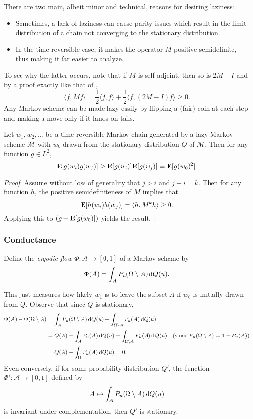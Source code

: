 There are two main, albeit minor and technical, reasons for desiring laziness:
\begin{itemize}
    \item Sometimes, a lack of laziness can cause parity issues which result in the limit distribution of a chain not converging to the stationary distribution.
    \item In the time-reversible case, it makes the operator $M$ positive semidefinite, thus making it far easier to analyze.
\end{itemize}
To see why the latter occurs, note that if $M$ is self-adjoint, then so is $2M-I$ and by a proof exactly like that of ,
\[ \langle f,M f\rangle = \frac{1}{2}\langle f,f\rangle + \frac{1}{2}\langle f,(2M-I)f\rangle \geq 0. \]
Any Markov scheme can be made lazy easily by flipping a (fair) coin at each step and making a move only if it lands on tails.

\begin{lemma}
Let $w_1,w_2,\ldots$ be a time-reversible Markov chain generated by a lazy Markov scheme $\mathcal{M}$ with $w_0$ drawn from the stationary distribution $Q$ of $\mathcal{M}$. Then for any function $g\in L^2$,
\[ \textbf{E}[g(w_i)g(w_j)] \geq \textbf{E}[g(w_i)]\textbf{E}[g(w_j)] = \textbf{E}[g(w_0)^2]. \]
\end{lemma}
\begin{proof}
Assume without loss of generality that $j>i$ and $j-i=k$. Then for any function $h$, the positive semidefiniteness of $M$ implies that
\[ \textbf{E}[h(w_i)h(w_j)] = \langle h, M^k h\rangle \geq 0. \]
Applying this to $(g - \textbf{E}[g(w_0)])$ yields the result.
\end{proof}

\subsubsection{Conductance}

\begin{definition}
Define the \textit{ergodic flow} $\Phi:\mathcal{A}\to[0,1]$ of a Markov scheme by
\[ \Phi(A) = \int_A P_u(\Omega \setminus A) \operatorname{d}\!{Q}(u). \]

\end{definition}

This just measures how likely $w_1$ is to leave the subset $A$ if $w_0$ is initially drawn from $Q$. Observe that since $Q$ is stationary,
\begin{align*}
    \Phi(A) - \Phi(\Omega\setminus A) &= \int_A P_u(\Omega\setminus A)\operatorname{d}\!{Q}(u) - \int_{\Omega\setminus A} P_u(A)\operatorname{d}\!{Q}(u) \\
    &= Q(A) - \int_A P_u(A)\operatorname{d}\!{Q}(u) - \int_{\Omega\setminus A} P_u(A)\operatorname{d}\!{Q}(u) & (\text{since } P_u(\Omega\setminus A)=1-P_u(A)) \\
    &= Q(A) - \int_\Omega P_u(A)\operatorname{d}\!{Q}(u) = 0.
\end{align*}
Even conversely, if for some probability distribution $Q'$, the function $\Phi':\mathcal{A}\to[0,1]$ defined by
\[ A\mapsto \int_A P_u(\Omega\setminus A)\operatorname{d}\!{Q}(u) \]
is invariant under complementation, then $Q'$ is stationary.\\


